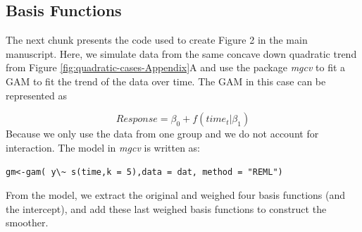 \documentclass[
]{article}
\newcommand{\passthrough}[1]{#1}
\begin{document}
\hypertarget{basis-functions}{%
\subsection{Basis Functions}\label{basis-functions}}

The next chunk presents the code used to create Figure 2 in the main manuscript. Here, we simulate data from the same concave down quadratic trend from Figure \ref{fig:quadratic-cases-Appendix}A and use the package \emph{mgcv} to fit a GAM to fit the trend of the data over time. The GAM in this case can be represented as

\[Response= \beta_0 + f(time_t|\beta_1)\]
Because we only use the data from one group and we do not account for interaction. The model in \emph{mgcv} is written as:

\passthrough{\lstinline!gm<-gam( y\~ s(time,k = 5),data = dat, method = "REML")!}

From the model, we extract the original and weighed four basis functions (and the intercept), and add these last weighed basis functions to construct the smoother.
\end{document}
